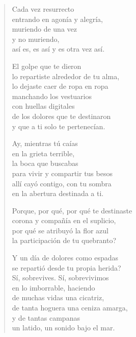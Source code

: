 \documentclass[12pt]{article}
\begin{document}
\clearpage
{}
\begin{verse}

Cada vez resurrecto\\
entrando en agonía y alegría,\\
muriendo de una vez\\
y no muriendo,\\
así es, es así y es otra vez así.  

El golpe que te dieron\\
lo repartiste alrededor de tu alma,\\
lo dejaste caer de ropa en ropa\\
manchando los vestuarios\\
con huellas digitales\\
de los dolores que te destinaron\\
y que a ti solo te pertenecían.  

Ay, mientras tú caías\\
en la grieta terrible,\\
la boca que buscabas\\
para vivir y compartir tus besos\\
allí cayó contigo, con tu sombra\\
en la abertura destinada a ti.  

Porque, por qué, por qué te destinaste\\
corona y compañía en el suplicio,\\
por qué se atribuyó la flor azul\\
la participación de tu quebranto?  

Y un día de dolores como espadas\\
se repartió desde tu propia herida?\\
Sí, sobrevives. Sí, sobrevivimos\\
en lo imborrable, haciendo\\
de muchas vidas una cicatriz,\\
de tanta hoguera una ceniza amarga,\\
y de tantas campanas\\
un latido, un sonido bajo el mar.  
\end{verse}
\end{document}

